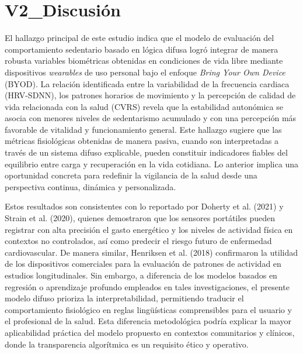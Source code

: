 \section{V2\_Discusión}
\label{sec:v2_discusion}

El hallazgo principal de este estudio indica que el modelo de evaluación del comportamiento sedentario basado en lógica difusa logró integrar de manera robusta variables biométricas obtenidas en condiciones de vida libre mediante dispositivos \textit{wearables} de uso personal bajo el enfoque \textit{Bring Your Own Device} (BYOD). La relación identificada entre la variabilidad de la frecuencia cardiaca (HRV-SDNN), los patrones horarios de movimiento y la percepción de calidad de vida relacionada con la salud (CVRS) revela que la estabilidad autonómica se asocia con menores niveles de sedentarismo acumulado y con una percepción más favorable de vitalidad y funcionamiento general. Este hallazgo sugiere que las métricas fisiológicas obtenidas de manera pasiva, cuando son interpretadas a través de un sistema difuso explicable, pueden constituir indicadores fiables del equilibrio entre carga y recuperación en la vida cotidiana. Lo anterior implica una oportunidad concreta para redefinir la vigilancia de la salud desde una perspectiva continua, dinámica y personalizada.

Estos resultados son consistentes con lo reportado por Doherty et al. (2021) y Strain et al. (2020), quienes demostraron que los sensores portátiles pueden registrar con alta precisión el gasto energético y los niveles de actividad física en contextos no controlados, así como predecir el riesgo futuro de enfermedad cardiovascular. De manera similar, Henriksen et al. (2018) confirmaron la utilidad de los dispositivos comerciales para la evaluación de patrones de actividad en estudios longitudinales. Sin embargo, a diferencia de los modelos basados en regresión o aprendizaje profundo empleados en tales investigaciones, el presente modelo difuso prioriza la interpretabilidad, permitiendo traducir el comportamiento fisiológico en reglas lingüísticas comprensibles para el usuario y el profesional de la salud. Esta diferencia metodológica podría explicar la mayor aplicabilidad práctica del modelo propuesto en contextos comunitarios y clínicos, donde la transparencia algorítmica es un requisito ético y operativo.

